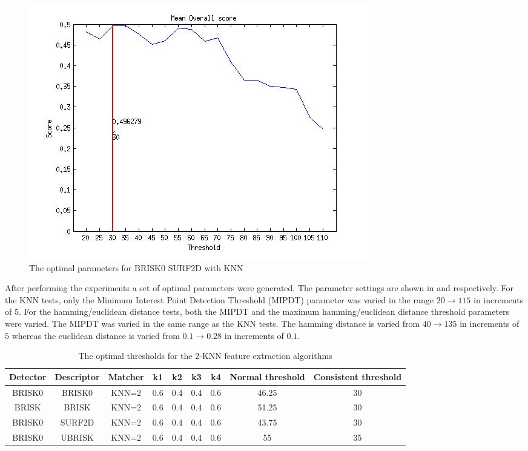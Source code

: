 \documentclass{article}
\begin{document}
\begin{figure}
\begin{minipage}[b]{0.5\linewidth}
\includegraphics[scale=0.5]{../Drawings/OptimalParameters_SBRISK_SURF2D_KNN.jpg}
\caption{The optimal parameters for BRISK0 SURF2D with KNN}
\label{fig:BRISK0surfknnOptimal}
\end{minipage}
\end{figure}

After performing the experiments a set of optimal parameters were generated. The parameter settings are shown in  and  respectively. For the KNN tests, only the Minimum Interest Point Detection Threshold (MIPDT) parameter was varied in the range $20 \rightarrow 115$ in increments of $5$. For the hamming/euclidean distance tests, both the MIPDT and the maximum hamming/euclidean distance threshold parameters were varied. The MIPDT was varied in the same range as the KNN tests. The hamming distance is varied from $40 \rightarrow 135$ in increments of $5$ whereas the euclidean distance is varied from $0.1 \rightarrow 0.28$ in increments of $0.1$. \\



\begin{table}
\caption{The optimal thresholds for the 2-KNN feature extraction algorithms}
\begin{tabular}{|c|c|c|c|c|c|c|c|c|}
\hline 
Detector & Descriptor & Matcher & k1 & k2 & k3 & k4 & Normal threshold & Consistent threshold\tabularnewline
\hline 
\hline 
BRISK0 & BRISK0 & KNN=2 & 0.6 & 0.4 & 0.4 & 0.6 & 46.25 & 30\tabularnewline
\hline 
BRISK & BRISK & KNN=2 & 0.6 & 0.4 & 0.4 & 0.6 & 51.25 & 30\tabularnewline
\hline 
BRISK0 & SURF2D & KNN=2 & 0.6 & 0.4 & 0.4 & 0.6 & 43.75 & 30\tabularnewline
\hline 
BRISK0 & UBRISK & KNN=2 & 0.6 & 0.4 & 0.4 & 0.6 & 55 & 35\tabularnewline
\hline 
\end{tabular}
\label{tab:knnStatistics}
\end{table}
\end{document}
